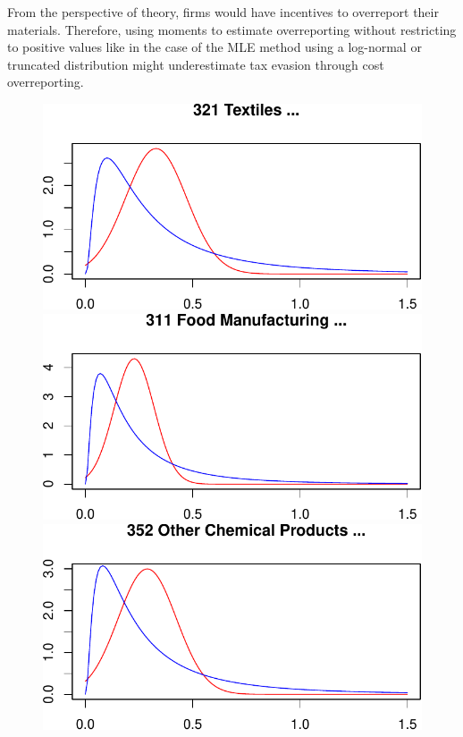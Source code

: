 \documentclass[
  12pt]{article}
\theoremstyle{definition}
\theoremstyle{remark}
\begin{document}
From the perspective of theory, firms would have incentives to
overreport their materials. Therefore, using moments to estimate
overreporting without restricting to positive values like in the case of
the MLE method using a log-normal or truncated distribution might
underestimate tax evasion through cost overreporting.

\begin{figure}

\begin{minipage}{\linewidth}

\includegraphics{Tax-Prod_files/figure-pdf/unnamed-chunk-36-1.pdf}

\includegraphics{Tax-Prod_files/figure-pdf/unnamed-chunk-36-2.pdf}

\includegraphics{Tax-Prod_files/figure-pdf/unnamed-chunk-36-3.pdf}


\end{minipage}
\end{figure}
\end{document}
